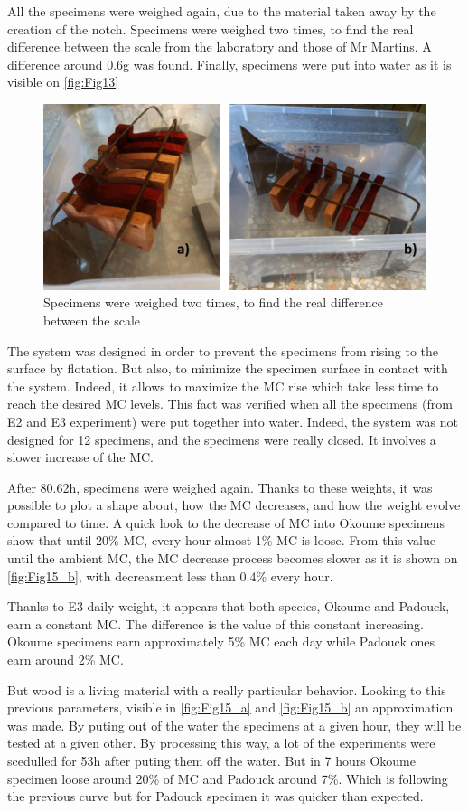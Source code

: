 All the specimens were weighed again, due to the material taken away by the creation of the notch.
Specimens were weighed two times, to find the real difference between the scale from the laboratory and those of Mr Martins. A difference around 0.6g was found. Finally, specimens were put into water as it is visible on \ref{fig:Fig13}
\begin{figure}[h]
	\includegraphics[width=\textwidth]{Figures/WaterSpecimens}
	Specimens were weighed two times, to find the real difference between the scale
\end{figure}
The system was designed in order to prevent the specimens from rising to the surface by flotation. But also, to minimize the specimen surface in contact with the system. Indeed, it allows to maximize the MC rise which take less time to reach the desired MC levels. This fact was verified when all the specimens (from E2 and E3 experiment) were put together into water. Indeed, the system was not designed for 12 specimens, and the specimens were really closed. It involves a slower increase of the MC.

After 80.62h, specimens were weighed again. Thanks to these weights, it was possible to plot a shape about, how the MC decreases, and how the weight evolve compared to time. A quick look to the decrease of MC into Okoume specimens show that until 20\% MC, every hour almost 1\% MC is loose. From this value until the ambient MC, the MC decrease process becomes slower as it is shown on \ref{fig:Fig15_b}, with decreasment less than 0.4\% every hour.

Thanks to E3 daily weight, it appears that both species, Okoume and Padouck, earn a constant MC. The difference is the value of this constant increasing. Okoume specimens earn approximately 5\% MC each day while Padouck ones earn around 2\% MC.

But wood is a living material with a really particular behavior. Looking to this previous parameters, visible in \ref{fig:Fig15_a} and \ref{fig:Fig15_b} an approximation was made. By puting out of the water the specimens at a given hour, they will be tested at a given other. By processing this way, a lot of the experiments were scedulled for 53h after puting them off the water. But in 7 hours Okoume specimen loose around 20\% of MC and Padouck around 7\%. Which is following the previous curve but for Padouck specimen it was quicker than expected.

